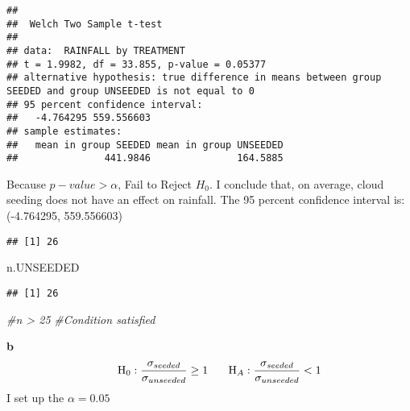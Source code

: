 \documentclass[
]{article}
\newenvironment{Shaded}{\begin{snugshade}}{\end{snugshade}}
\newcommand{\AttributeTok}[1]{\textcolor[rgb]{0.77,0.63,0.00}{#1}}
\newcommand{\CommentTok}[1]{\textcolor[rgb]{0.56,0.35,0.01}{\textit{#1}}}
\newcommand{\DecValTok}[1]{\textcolor[rgb]{0.00,0.00,0.81}{#1}}
\newcommand{\FunctionTok}[1]{\textcolor[rgb]{0.00,0.00,0.00}{#1}}
\newcommand{\NormalTok}[1]{#1}
\newcommand{\OtherTok}[1]{\textcolor[rgb]{0.56,0.35,0.01}{#1}}
\newcommand{\SpecialCharTok}[1]{\textcolor[rgb]{0.00,0.00,0.00}{#1}}
\begin{document}
\begin{verbatim}
## 
##  Welch Two Sample t-test
## 
## data:  RAINFALL by TREATMENT
## t = 1.9982, df = 33.855, p-value = 0.05377
## alternative hypothesis: true difference in means between group SEEDED and group UNSEEDED is not equal to 0
## 95 percent confidence interval:
##   -4.764295 559.556603
## sample estimates:
##   mean in group SEEDED mean in group UNSEEDED 
##               441.9846               164.5885
\end{verbatim}

Because \(p-value > \alpha\), Fail to Reject \(H_{0}\). I conclude that,
on average, cloud seeding does not have an effect on rainfall. The 95
percent confidence interval is: (-4.764295, 559.556603)

\begin{Shaded}
\end{Shaded}

\begin{verbatim}
## [1] 26
\end{verbatim}

\begin{Shaded}
\begin{Highlighting}[]
\NormalTok{n.UNSEEDED}
\end{Highlighting}
\end{Shaded}

\begin{verbatim}
## [1] 26
\end{verbatim}

\begin{Shaded}
\begin{Highlighting}[]
\CommentTok{\#n \textgreater{} 25 }
\CommentTok{\#Condition satisfied}
\end{Highlighting}
\end{Shaded}

\textbf{b} \[
\hspace{0.25in} {\rm H}_{0}: \frac{\sigma_{seeded}}{\sigma_{unseeded}} \ge 1 \hspace{0.25in} 
\\
\hspace{0.25in} {\rm H}_{A}: \frac{\sigma_{seeded}}{\sigma_{unseeded}} < 1  
\] I set up the \(\alpha = 0.05\)
\end{document}

